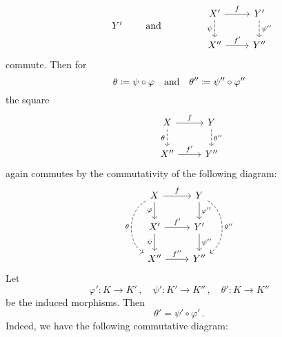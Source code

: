 \begin{remark*}
\begin{enumerate}
\begin{itemize}
\[\begin{tikzcd}
              & Y'
            \end{tikzcd}
            \qquad\text{and}\qquad
            \begin{tikzcd}
              & X'
                \arrow{r}[above]{f}
                \arrow[dashed]{d}[left]{\psi}
              & Y'
                \arrow[dashed]{d}[right]{\psi''}
              \\
              & X''
                \arrow{r}[above]{f'}
              & Y''
            \end{tikzcd}
          \]
          commute.
          Then for
          \[
                      \theta
            \coloneqq  \psi \circ  \varphi
            \quad\text{and}\quad
                      \theta''
            \coloneqq  \psi'' \circ \varphi''
          \]
          the square
          \[
            \begin{tikzcd}
              & X
                \arrow{r}[above]{f}
                \arrow[dashed]{d}[left]{\theta}
              & Y
                \arrow[dashed]{d}[right]{\theta''}
              \\
              & X''
                \arrow{r}[above]{f'}
              & Y''
            \end{tikzcd}
          \]
          again commutes by the commutativity of the following diagram:
          \[
            \begin{tikzcd}
                X
                \arrow{r}[above]{f}
                \arrow{d}[left]{\varphi}
                \arrow[dashed, bend right = 60]{dd}[left]{\theta}
              & Y
                \arrow{d}[right]{\varphi''}
                \arrow[dashed, bend left = 60]{dd}[right]{\theta''}
              \\
                X'
                \arrow{r}[above]{f'}
                \arrow{d}[left]{\psi}
              & Y'
                \arrow{d}[right]{\psi''}
              \\
                X''
                \arrow{r}[above]{f''}
              & Y''
            \end{tikzcd}
          \]
          Let
          \[
            \varphi' \colon K \to K' \,,
            \quad
            \psi' \colon K' \to K'' \,,
            \quad
            \theta' \colon K \to K''
          \]
          be the induced morphisms.
          Then
          \[
              \theta'
            = \psi' \circ \varphi'  \,.
          \]
          Indeed, we have the following commutative diagram:
          \[
            \begin{tikzcd}[sep = huge]

\end{tikzcd}\]
\end{itemize}
\end{enumerate}
\end{remark*}
